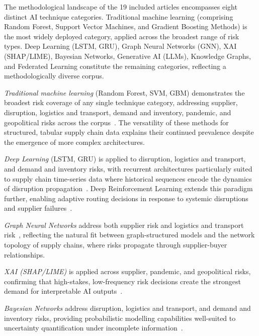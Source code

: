 The methodological landscape of the 19 included articles encompasses eight distinct AI technique categories. Traditional machine learning (comprising Random Forest, Support Vector Machines, and Gradient Boosting Methods) is the most widely deployed category, applied across the broadest range of risk types. Deep Learning (LSTM, GRU), Graph Neural Networks (GNN), XAI (SHAP/LIME), Bayesian Networks, Generative AI (LLMs), Knowledge Graphs, and Federated Learning constitute the remaining categories, reflecting a methodologically diverse corpus.

\textit{Traditional machine learning} (Random Forest, SVM, GBM) demonstrates the broadest risk coverage of any single technique category, addressing supplier, disruption, logistics and transport, demand and inventory, pandemic, and geopolitical risks across the corpus~\cite{adom2025design,aldehayyat2025applying,yang2025design,gupta2025supplier}. The versatility of these methods for structured, tabular supply chain data explains their continued prevalence despite the emergence of more complex architectures.

\textit{Deep Learning} (LSTM, GRU) is applied to disruption, logistics and transport, and demand and inventory risks, with recurrent architectures particularly suited to supply chain time-series data where historical sequences encode the dynamics of disruption propagation~\cite{li2025endtoend,farzhana2025hybrid}. Deep Reinforcement Learning extends this paradigm further, enabling adaptive routing decisions in response to systemic disruptions and supplier failures~\cite{renuga2026ai}.

\textit{Graph Neural Networks} address both supplier risk and logistics and transport risk~\cite{yang2024building,farzhana2025hybrid,renuga2026ai}, reflecting the natural fit between graph-structured models and the network topology of supply chains, where risks propagate through supplier-buyer relationships.

\textit{XAI (SHAP/LIME)} is applied across supplier, pandemic, and geopolitical risks, confirming that high-stakes, low-frequency risk decisions create the strongest demand for interpretable AI outputs~\cite{kumar2023enhancing,nimmy2022explainability,li2025endtoend,adom2025design}.

\textit{Bayesian Networks} address disruption, logistics and transport, and demand and inventory risks, providing probabilistic modelling capabilities well-suited to uncertainty quantification under incomplete information~\cite{deivaganesh2022future,nayal2022exploring,renuga2026ai}.

